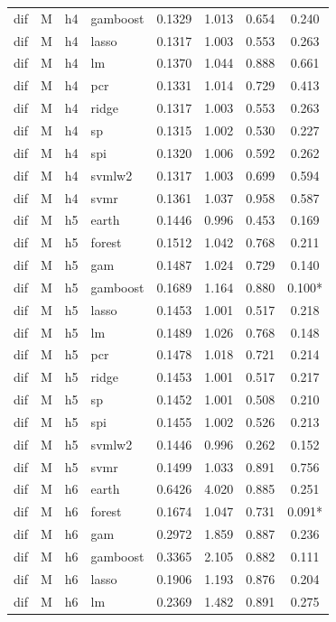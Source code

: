 \begin{ThreePartTable}
\begin{longtable}[t]{llclcccc}
dif & M & h4 & gamboost & 0.1329 & 1.013 & 0.654 & 0.240\\
dif & M & h4 & lasso & 0.1317 & 1.003 & 0.553 & 0.263\\
dif & M & h4 & lm & 0.1370 & 1.044 & 0.888 & 0.661\\
dif & M & h4 & pcr & 0.1331 & 1.014 & 0.729 & 0.413\\
dif & M & h4 & ridge & 0.1317 & 1.003 & 0.553 & 0.263\\
dif & M & h4 & sp & 0.1315 & 1.002 & 0.530 & 0.227\\
dif & M & h4 & spi & 0.1320 & 1.006 & 0.592 & 0.262\\
dif & M & h4 & svmlw2 & 0.1317 & 1.003 & 0.699 & 0.594\\
dif & M & h4 & svmr & 0.1361 & 1.037 & 0.958 & 0.587\\
\addlinespace
dif & M & h5 & earth & 0.1446 & 0.996 & 0.453 & 0.169\\
dif & M & h5 & forest & 0.1512 & 1.042 & 0.768 & 0.211\\
dif & M & h5 & gam & 0.1487 & 1.024 & 0.729 & 0.140\\
dif & M & h5 & gamboost & 0.1689 & 1.164 & 0.880 & 0.100*\\
dif & M & h5 & lasso & 0.1453 & 1.001 & 0.517 & 0.218\\
dif & M & h5 & lm & 0.1489 & 1.026 & 0.768 & 0.148\\
dif & M & h5 & pcr & 0.1478 & 1.018 & 0.721 & 0.214\\
dif & M & h5 & ridge & 0.1453 & 1.001 & 0.517 & 0.217\\
dif & M & h5 & sp & 0.1452 & 1.001 & 0.508 & 0.210\\
dif & M & h5 & spi & 0.1455 & 1.002 & 0.526 & 0.213\\
dif & M & h5 & svmlw2 & 0.1446 & 0.996 & 0.262 & 0.152\\
dif & M & h5 & svmr & 0.1499 & 1.033 & 0.891 & 0.756\\
\addlinespace
dif & M & h6 & earth & 0.6426 & 4.020 & 0.885 & 0.251\\
dif & M & h6 & forest & 0.1674 & 1.047 & 0.731 & 0.091*\\
dif & M & h6 & gam & 0.2972 & 1.859 & 0.887 & 0.236\\
dif & M & h6 & gamboost & 0.3365 & 2.105 & 0.882 & 0.111\\
dif & M & h6 & lasso & 0.1906 & 1.193 & 0.876 & 0.204\\
dif & M & h6 & lm & 0.2369 & 1.482 & 0.891 & 0.275\\

\end{longtable}
\end{ThreePartTable}
